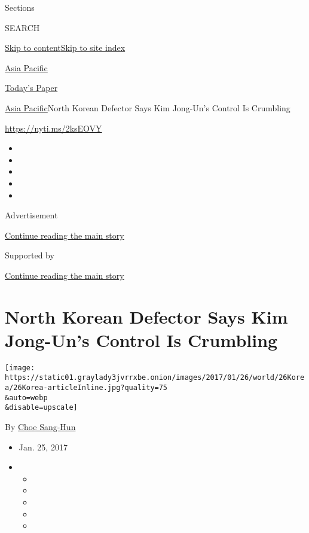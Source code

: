 Sections

SEARCH

\protect\hyperlink{site-content}{Skip to
content}\protect\hyperlink{site-index}{Skip to site index}

\href{https://www.nytimes3xbfgragh.onion/section/world/asia}{Asia
Pacific}

\href{https://myaccount.nytimes3xbfgragh.onion/auth/login?response_type=cookie\&client_id=vi}{}

\href{https://www.nytimes3xbfgragh.onion/section/todayspaper}{Today's
Paper}

\href{/section/world/asia}{Asia Pacific}\textbar{}North Korean Defector
Says Kim Jong-Un's Control Is Crumbling

\url{https://nyti.ms/2ksEOVY}

\begin{itemize}
\item
\item
\item
\item
\item
\end{itemize}

Advertisement

\protect\hyperlink{after-top}{Continue reading the main story}

Supported by

\protect\hyperlink{after-sponsor}{Continue reading the main story}

\hypertarget{north-korean-defector-says-kim-jong-uns-control-is-crumbling}{%
\section{North Korean Defector Says Kim Jong-Un's Control Is
Crumbling}\label{north-korean-defector-says-kim-jong-uns-control-is-crumbling}}

\texttt{[image: https://static01.graylady3jvrrxbe.onion/images/2017/01/26/world/26Korea/26Korea-articleInline.jpg?quality=75\\\&auto=webp\\\&disable=upscale]}

By \href{http://www.nytimes3xbfgragh.onion/by/choe-sang-hun}{Choe
Sang-Hun}

\begin{itemize}
\item
  Jan. 25, 2017
\item
  \begin{itemize}
  \item
  \item
  \item
  \item
  \item
  \end{itemize}
\end{itemize}

